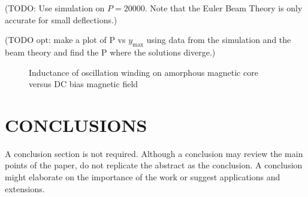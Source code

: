 \documentclass[letterpaper, 10 pt, conference]{ieeeconf}  %
\begin{document}
(TODO: Use simulation on $P = 20000$. Note that the Euler Beam Theory is only accurate for small deflections.)

(TODO opt: make a plot of P vs $y_{\text{max}}$ using data from the simulation and the beam theory and find the P where the solutions diverge.)


   \begin{figure}[thpb]
      \centering
      \caption{Inductance of oscillation winding on amorphous
       magnetic core versus DC bias magnetic field}
      \label{figurelabel}
   \end{figure}


\section{CONCLUSIONS}

A conclusion section is not required. Although a conclusion may review the main points of the paper, do not replicate the abstract as the conclusion. A conclusion might elaborate on the importance of the work or suggest applications and extensions.

\addtolength{\textheight}{-12cm}   %




\end{document}
